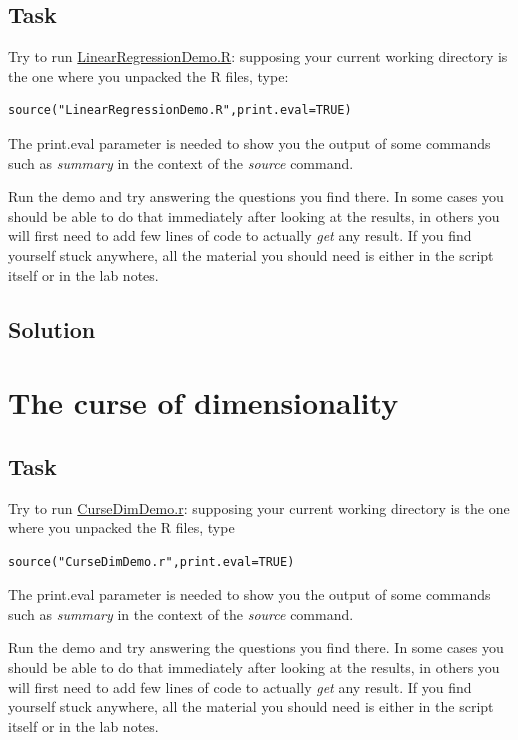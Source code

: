 \documentclass[a4paper,12pt,titlepage]{article} %
\begin{document}
\subsection{Task}
Try to run \underline{LinearRegressionDemo.R}: supposing your current working directory is the one where you unpacked the R files, type:
\begin{verbatim}
source("LinearRegressionDemo.R",print.eval=TRUE)
\end{verbatim}

The print.eval parameter is needed to show you the output of some commands such as \textit{summary} in the context of the \textit{source} command.

Run the demo and try answering the questions you find there. In some cases you should be able to do that immediately after looking at the results, in others you will first need to add few lines of code to actually \textit{get} any result. If you find yourself stuck anywhere, all the material you should need is either in the script itself or in the lab notes.

\subsection{Solution}


\newpage
\section{The curse of dimensionality}
\subsection{Task}
Try to run \underline{CurseDimDemo.r}: supposing your current working directory is the one where you unpacked the R files, type
\begin{verbatim}
source("CurseDimDemo.r",print.eval=TRUE)
\end{verbatim}

The print.eval parameter is needed to show you the output of some commands such as \textit{summary} in the context of the \textit{source} command.

Run the demo and try answering the questions you find there. In some cases you should be able to do that immediately after looking at the results, in others you will first need to add few lines of code to actually \textit{get} any result. If you find yourself stuck anywhere, all the material you should need is either in the script itself or in the lab notes.
\end{document}
